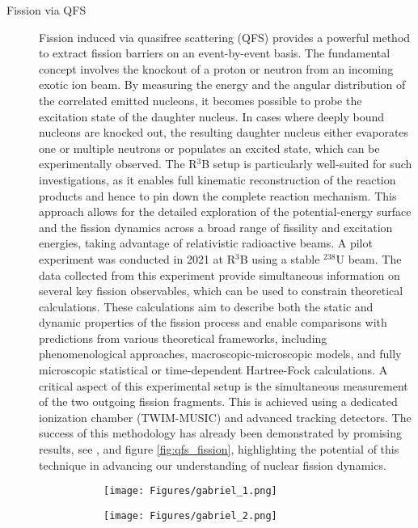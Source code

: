 \begin{description}
\item[Fission via QFS]Fission induced via quasifree scattering (QFS) provides a powerful method to extract fission barriers on an event-by-event basis. The fundamental concept involves the knockout of a proton or neutron from an incoming exotic ion beam. By measuring the energy  and the angular distribution of the correlated emitted nucleons, it becomes possible to probe the excitation state of the daughter nucleus. In cases where deeply bound nucleons are knocked out, the resulting daughter nucleus either evaporates one or multiple neutrons or populates an excited state, which can be experimentally observed. The R$^3$B setup is particularly well-suited for such investigations, as it enables full kinematic reconstruction of the reaction products and hence to pin down the complete reaction mechanism. This approach allows for the detailed exploration of the potential-energy surface and the fission dynamics across a broad range of fissility and excitation energies, taking advantage of relativistic radioactive beams.\newline
A pilot experiment was conducted in 2021 at R$^3$B using a stable $^{238}$U beam. The data collected from this experiment provide simultaneous information on several key fission observables, which can be used to constrain theoretical calculations. These calculations aim to describe both the static and dynamic properties of the fission process and enable comparisons with predictions from various theoretical frameworks, including phenomenological approaches, macroscopic-microscopic models, and fully microscopic statistical or time-dependent Hartree-Fock calculations.\newline
A critical aspect of this experimental setup is the simultaneous measurement of the two outgoing fission fragments. This is achieved using a dedicated ionization chamber (TWIM-MUSIC) and advanced tracking detectors. The success of this methodology has already been demonstrated by promising results, see \cite{garcia2023study},\cite{grana2023fission} and figure \ref{fig:qfs_fission}, highlighting the potential of this technique in advancing our understanding of nuclear fission dynamics.
\begin{figure}[htpb]
    \centering
    \begin{subfigure}[b]{0.3\textwidth}
    \texttt{[image: Figures/gabriel\_1.png]} 
    \end{subfigure}
    \begin{subfigure}[b]{0.3\textwidth}
    \texttt{[image: Figures/gabriel\_2.png]} 

\end{subfigure}
\end{figure}
\end{description}

